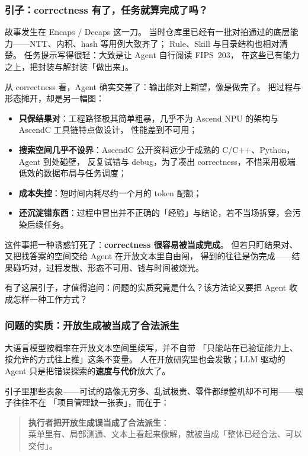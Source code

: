 \documentclass[UTF8,a4paper,11pt]{ctexart}
\theoremstyle{definition}
\theoremstyle{plain}
\theoremstyle{remark}
\numberwithin{figure}{section}
\numberwithin{table}{section}
\begin{document}
\subsubsection{引子：correctness 有了，任务就算完成了吗？}

故事发生在 Encaps / Decaps 这一刀。
当时仓库里已经有一批对拍通过的底层能力——NTT、内积、hash 等用例大致齐了；
Rule、Skill 与目录结构也相对清楚。
任务提示写得很轻：大致是让 Agent 自行阅读 FIPS~203，
在这些已有能力之上，把封装与解封装「做出来」。

从 correctness 看，Agent 确实交差了：输出能对上期望，像是做完了。
把过程与形态摊开，却是另一幅图：

\begin{itemize}
  \item \textbf{只保结果对}：工程路径极其简单粗暴，几乎不为 Ascend NPU 的架构与 AscendC 工具链特点做设计，
        性能差到不可用；
  \item \textbf{搜索空间几乎不设界}：AscendC 公开资料远少于成熟的 C/C++、Python，Agent 到处碰壁，
        反复试错与 debug，为了凑出 correctness，不惜采用极端低效的数据布局与任务调度；
  \item \textbf{成本失控}：短时间内耗尽约一个月的 token 配额；
  \item \textbf{还沉淀错东西}：过程中冒出并不正确的「经验」与结论，若不当场拆穿，会污染后续任务。
\end{itemize}

这件事把一种诱惑钉死了：\textbf{correctness 很容易被当成完成}。
但若只盯结果对、又把找答案的空间交给 Agent 在开放文本里自由闯，
得到的往往是伪完成——结果碰巧对，过程发散、形态不可用、钱与时间被烧光。

有了这层引子，才值得追问：问题的实质究竟是什么？该方法论又要把 Agent 收成怎样一种工作方式？

\subsubsection{问题的实质：开放生成被当成了合法派生}

大语言模型按概率在开放文本空间里续写，并不自带
「只能站在已验证能力上、按允许的方式往上推」这条不变量。
人在开放研究里也会发散；LLM 驱动的 Agent 只是把错误探索的\textbf{速度与代价}放大了。

引子里那些表象——可试的路像无穷多、乱试极贵、零件都绿整机却不可用——根子往往不在
「项目管理缺一张表」，而在于：

\begin{quote}
\noindent
\textbf{执行者把开放生成误当成了合法派生}：\\
菜单里有、局部测通、文本上看起来像解，就被当成「整体已经合法、可以交付」。
\end{quote}
\end{document}
